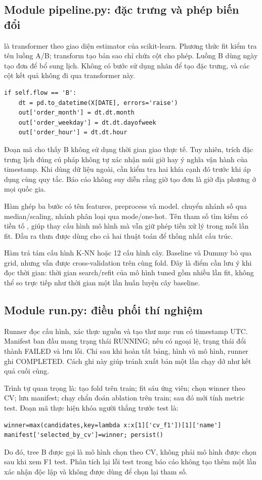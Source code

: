 \subsection{Module pipeline.py: đặc trưng và phép biến đổi}
 là transformer theo giao diện estimator của
scikit-learn. Phương thức fit kiểm tra tên luồng A/B; transform tạo bản sao
chỉ chứa cột cho phép. Luồng B dùng ngày tạo đơn để bổ sung lịch. Không có
bước sử dụng nhãn để tạo đặc trưng, và các cột kết quả không đi qua
transformer này.

\begin{verbatim}
if self.flow == 'B':
    dt = pd.to_datetime(X[DATE], errors='raise')
    out['order_month'] = dt.dt.month
    out['order_weekday'] = dt.dt.dayofweek
    out['order_hour'] = dt.dt.hour
\end{verbatim}
Đoạn mã cho thấy B không sử dụng thời gian giao thực tế. Tuy nhiên, trích
đặc trưng lịch đúng cú pháp không tự xác nhận múi giờ hay ý nghĩa vận hành
của timestamp. Khi dùng dữ liệu ngoài, cần kiểm tra hai khía cạnh đó trước
khi áp dụng cùng quy tắc. Báo cáo không suy diễn rằng giờ tạo đơn là giờ
địa phương ở mọi quốc gia.

Hàm  ghép ba bước có tên features, preprocess và model.
 chuyển nhánh số qua median/scaling, nhánh phân
loại qua mode/one-hot. Tên tham số tìm kiếm có tiền tố ,
giúp thay cấu hình mô hình mà vẫn giữ phép tiền xử lý trong mỗi lần fit.
Đầu ra thưa được dùng cho cả hai thuật toán để thống nhất cấu trúc.

Hàm  trả tám cấu hình K-NN hoặc 12 cấu hình cây. Baseline và
Dummy bỏ qua grid, nhưng vẫn được cross-validation trên cùng fold. Đây
là điểm cần lưu ý khi đọc thời gian: thời gian search/refit của mô hình
tuned gồm nhiều lần fit, không thể so trực tiếp như thời gian một lần
huấn luyện cây baseline.

\subsection{Module run.py: điều phối thí nghiệm}
Runner đọc cấu hình, xác thực nguồn và tạo thư mục run có timestamp UTC.
Manifest ban đầu mang trạng thái RUNNING; nếu có ngoại lệ, trạng thái đổi
thành FAILED và lưu lỗi. Chỉ sau khi hoàn tất bảng, hình và mô hình, runner
ghi COMPLETED. Cách ghi này giúp tránh xuất bản một lần chạy dở như kết
quả cuối cùng.

Trình tự quan trọng là: tạo fold trên train; fit sáu ứng viên; chọn winner
theo CV; lưu manifest; chạy chẩn đoán ablation trên train; sau đó mới tính
metric test. Đoạn mã thực hiện khóa người thắng trước test là:
\begin{verbatim}
winner=max(candidates,key=lambda x:x[1]['cv_f1'])[1]['name']
manifest['selected_by_cv']=winner; persist()
\end{verbatim}
Do đó, tree B được gọi là mô hình chọn theo CV, không phải mô hình được
chọn sau khi xem F1 test. Phân tích lại lỗi test trong báo cáo không tạo
thêm một lần xác nhận độc lập và không được dùng để chọn lại tham số.

